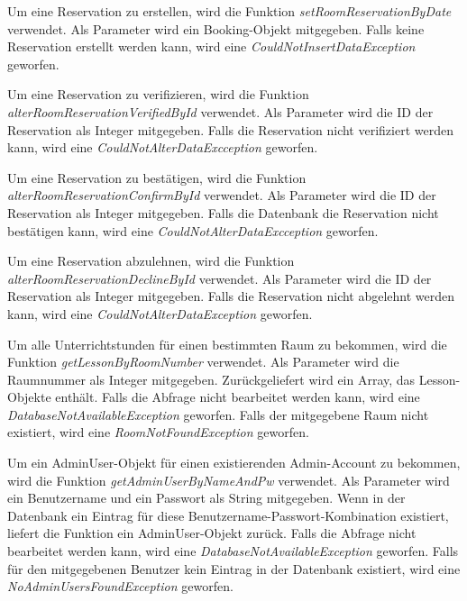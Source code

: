 
Um eine Reservation zu erstellen, wird die Funktion \emph{setRoomReservationByDate} verwendet. Als Parameter wird ein Booking-Objekt mitgegeben. Falls keine Reservation erstellt werden kann, wird eine \emph{CouldNotInsertDataException} geworfen. 


Um eine Reservation zu verifizieren, wird die Funktion \emph{alterRoomReservationVerifiedById} verwendet. Als Parameter wird die ID der Reservation als Integer mitgegeben. Falls die Reservation nicht verifiziert werden kann, wird eine \emph{CouldNotAlterDataExcception} geworfen.


Um eine Reservation zu bestätigen, wird die Funktion \emph{alterRoomReservationConfirmById} verwendet. Als Parameter wird die ID der Reservation als Integer mitgegeben. Falls die Datenbank die Reservation nicht bestätigen kann, wird eine \emph{CouldNotAlterDataExcception} geworfen. 


Um eine Reservation abzulehnen, wird die Funktion \emph{alterRoomReservationDeclineById} verwendet. Als Parameter wird die ID der Reservation als Integer mitgegeben. Falls die Reservation nicht abgelehnt werden kann, wird eine \emph{CouldNotAlterDataException} geworfen.


Um alle Unterrichtstunden für einen bestimmten Raum zu bekommen, wird die Funktion \emph{getLessonByRoomNumber} verwendet. Als Parameter wird die Raumnummer als Integer mitgegeben. Zurückgeliefert wird ein Array, das Lesson-Objekte enthält. Falls die Abfrage nicht bearbeitet werden kann, wird eine \emph{DatabaseNotAvailableException} geworfen. Falls der mitgegebene Raum nicht existiert, wird eine \emph{RoomNotFoundException} geworfen.


Um ein AdminUser-Objekt für einen existierenden Admin-Account zu bekommen, wird die Funktion \emph{getAdminUserByNameAndPw} verwendet. Als Parameter wird ein Benutzername und ein Passwort als String mitgegeben. Wenn in der Datenbank ein Eintrag für diese Benutzername-Passwort-Kombination existiert, liefert die Funktion ein AdminUser-Objekt zurück. Falls die Abfrage nicht bearbeitet werden kann, wird eine \emph{DatabaseNotAvailableException} geworfen. Falls für den mitgegebenen Benutzer kein Eintrag in der Datenbank existiert, wird eine \emph {NoAdminUsersFoundException} geworfen.